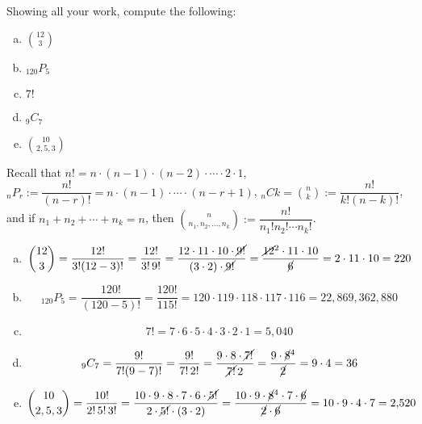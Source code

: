 \documentclass[11pt,letterpaper]{article}
\begin{document}
\newpage



 Showing all your work, compute the following:
	\begin{enumerate}[(a)]
	\item $\binom{12}{3}$
	\item $_{120} P_5$
	\item $7!$
	\item $_{9} C_{7}$
	\item $\binom{10}{2,5,3}$
	\end{enumerate} \pspace

\sol Recall that $n!= n \cdot (n - 1) \cdot (n - 2) \cdot \cdots \cdot 2 \cdot 1$, $_nP_r:= \dfrac{n!}{(n - r)!}= n \cdot (n - 1) \cdot \cdots \cdot (n - r + 1)$, $_nCk= \binom{n}{k}:= \dfrac{n!}{k! (n - k)!}$, and if $n_1 + n_2 + \cdots + n_k= n$, then $\binom{n}{n_1, n_2, \ldots, n_k}:= \dfrac{n!}{n_1! n_2! \cdots n_k!}$. 

\begin{enumerate}[(a)]
\item 
	\[
	\binom{12}{3}= \dfrac{12!}{3! (12 - 3)!}= \dfrac{12!}{3!\, 9!}= \dfrac{12 \cdot 11 \cdot 10 \cdot \cancel{9!}}{(3 \cdot 2) \cdot \cancel{9!}}= \dfrac{\cancel{12}^2 \cdot 11 \cdot 10}{\cancel{6}}= 2 \cdot 11 \cdot 10= 220
	\] \pspace

\item 
	\[
	_{120}P_5= \dfrac{120!}{(120 - 5)!}= \dfrac{120!}{115!}= 120 \cdot 119 \cdot 118 \cdot 117 \cdot 116= 22,\!869,\!362,\!880
	\] \pspace

\item 
	\[
	7!= 7 \cdot 6 \cdot 5 \cdot 4 \cdot 3 \cdot 2 \cdot 1= 5,\!040
	\] \pspace

\item 
	\[
	_9C_7= \dfrac{9!}{7! (9 - 7)!}= \dfrac{9!}{7! \, 2!}= \dfrac{9 \cdot 8 \cdot \cancel{7!}}{\cancel{7!} \, 2}= \dfrac{9 \cdot \cancel{8}^4}{\cancel{2}}= 9 \cdot 4= 36
	\] \pspace

\item 
	\[
	\binom{10}{2,5,3}= \dfrac{10!}{2! \, 5! \, 3!}= \dfrac{10 \cdot 9 \cdot 8 \cdot 7 \cdot 6 \cdot \cancel{5!}}{2 \cdot \cancel{5!} \cdot (3 \cdot 2)}= \dfrac{10 \cdot 9 \cdot \cancel{8}^4 \cdot 7 \cdot \cancel{6}}{\cancel{2} \cdot \cancel{6}}= 10 \cdot 9 \cdot 4 \cdot 7= 2,\!520
	\]
\end{enumerate}



\newpage
\end{document}
